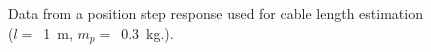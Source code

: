 
\begin{figure}
    \captionsetup[subfigure]{justification=centering}
    \centering
    \caption{ Data from a position step response used for cable length estimation 
    ($l =$~\SI{1}{\metre}, $m_p =$~\SI{0.3}{\kilo\gram}.).}
    \label{fig:FFT_pos_step_subfigs}  
\end{figure}